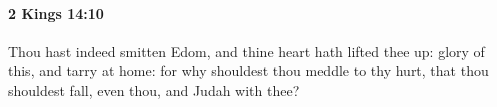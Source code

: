
		\paragraph{2 Kings 14:10} %
			\label{2KINGS-14-10}

			Thou hast indeed smitten Edom, and thine heart hath lifted thee up: glory of this, and tarry at home: for why shouldest thou meddle to thy hurt, that thou shouldest fall, even thou, and Judah with thee?


